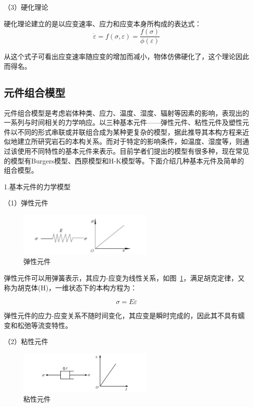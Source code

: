 （3）硬化理论

硬化理论建立的是以应变速率、应力和应变本身所构成的表达式：
\begin{equation}
     {\dot{\varepsilon}}=f({\sigma},{\varepsilon})=\frac{f(\sigma)}{\phi(\varepsilon)}
\end{equation}

从这个式子可看出应变速率随应变的增加而减小，物体仿佛硬化了，这个理论因此而得名。

\subsection{元件组合模型}
元件组合模型是考虑岩体种类、应力、温度、湿度、辐射等因素的影响，表现出的一系列与时间相关的力学响应。以三种基本元件——弹性元件、粘性元件及塑性元件以不同的形式串联或并联组合成为某种更复杂的模型，据此推导其本构方程来近似地建立所研究岩石的本构关系。而对于特定的影响条件，如温度、湿度等，则通过该使用不同特性的基本元件来表示。目前学者们提出的模型有很多种，现在常见的模型有Burgers模型、西原模型和H-K模型等。下面介绍几种基本元件及简单的组合模型。

1.基本元件的力学模型

（1）弹性元件
\begin{figure}[ht!]
    \centering
            \centering
            \includegraphics[width=0.6\textwidth]{img/chap3/Elastic element.png}
    \caption{弹性元件}
    \label{fig:3-2}
\end{figure}

弹性元件可以用弹簧表示，其应力-应变为线性关系，如图~\ref{fig:3-2}，满足胡克定律，又称为胡克体(H)，一维状态下的本构方程为：

\begin{equation}
{\sigma}={E}{\varepsilon}
\end{equation}

弹性元件的应力-应变关系不随时间变化，其应变是瞬时完成的，因此其不具有蠕变和松弛等流变特性。

（2）粘性元件
\begin{figure}[ht!]
    \centering
            \centering
            \includegraphics[width=0.6\textwidth]{img/chap3/Viscous element.png}
    \caption{粘性元件}
    \label{fig:3-3}
\end{figure}

